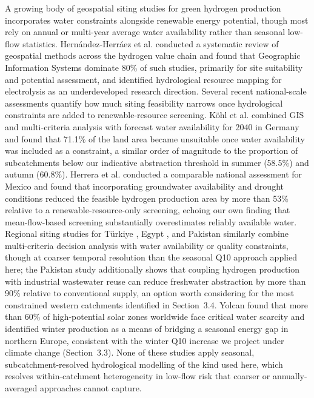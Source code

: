 \documentclass[draft]{agujournal2019}
\begin{document}
A growing body of geospatial siting studies for green hydrogen production incorporates water constraints alongside renewable energy potential, though most rely on annual or multi-year average water availability rather than seasonal low-flow statistics. Hern\'andez-Herr\'aez et al.  conducted a systematic review of geospatial methods across the hydrogen value chain and found that Geographic Information Systems dominate 80\% of such studies, primarily for site suitability and potential assessment, and identified hydrological resource mapping for electrolysis as an underdeveloped research direction. Several recent national-scale assessments quantify how much siting feasibility narrows once hydrological constraints are added to renewable-resource screening. K\"ohl et al.  combined GIS and multi-criteria analysis with forecast water availability for 2040 in Germany and found that 71.1\% of the land area became unsuitable once water availability was included as a constraint, a similar order of magnitude to the proportion of subcatchments below our indicative abstraction threshold in summer (58.5\%) and autumn (60.8\%). Herrera et al.  conducted a comparable national assessment for Mexico and found that incorporating groundwater availability and drought conditions reduced the feasible hydrogen production area by more than 53\% relative to a renewable-resource-only screening, echoing our own finding that mean-flow-based screening substantially overestimates reliably available water. Regional siting studies for T\"urkiye \cite{Ucar2026}, Egypt \cite{ElAassar2026}, and Pakistan \cite{Raja2026} similarly combine multi-criteria decision analysis with water availability or quality constraints, though at coarser temporal resolution than the seasonal Q10 approach applied here; the Pakistan study additionally shows that coupling hydrogen production with industrial wastewater reuse can reduce freshwater abstraction by more than 90\% relative to conventional supply, an option worth considering for the most constrained western catchments identified in Section~3.4. Yolcan  found that more than 60\% of high-potential solar zones worldwide face critical water scarcity and identified winter production as a means of bridging a seasonal energy gap in northern Europe, consistent with the winter Q10 increase we project under climate change (Section~3.3). None of these studies apply seasonal, subcatchment-resolved hydrological modelling of the kind used here, which resolves within-catchment heterogeneity in low-flow risk that coarser or annually-averaged approaches cannot capture.
\end{document}

